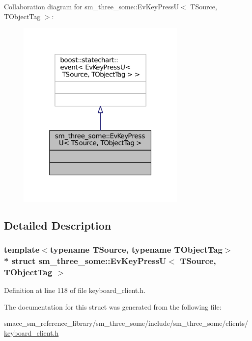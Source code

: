 Collaboration diagram for sm\+\_\+three\+\_\+some\+:\+:Ev\+Key\+PressU$<$ T\+Source, T\+Object\+Tag $>$\+:
\nopagebreak
\begin{figure}[H]
\begin{center}
\leavevmode
\includegraphics[width=235pt]{structsm__three__some_1_1EvKeyPressU__coll__graph}
\end{center}
\end{figure}


\subsection{Detailed Description}
\subsubsection*{template$<$typename T\+Source, typename T\+Object\+Tag$>$\\*
struct sm\+\_\+three\+\_\+some\+::\+Ev\+Key\+Press\+U$<$ T\+Source, T\+Object\+Tag $>$}



Definition at line 118 of file keyboard\+\_\+client.\+h.



The documentation for this struct was generated from the following file\+:\begin{DoxyCompactItemize}
\item 
smacc\+\_\+sm\+\_\+reference\+\_\+library/sm\+\_\+three\+\_\+some/include/sm\+\_\+three\+\_\+some/clients/\hyperlink{keyboard__client_8h}{keyboard\+\_\+client.\+h}\end{DoxyCompactItemize}

